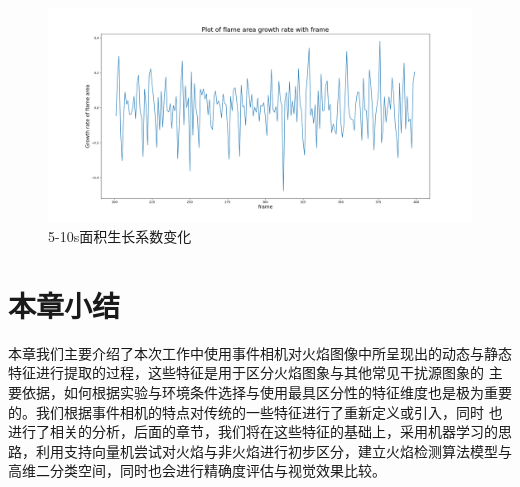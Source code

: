 \begin{figure}[ht]
        \centering
        \includegraphics[width=\textwidth]{figures/extract_area_02.png}
        \caption{5-10s面积生长系数变化}
        \label{13}
\end{figure}

\section{本章小结}
本章我们主要介绍了本次工作中使用事件相机对火焰图像中所呈现出的动态与静态特征进行提取的过程，这些特征是用于区分火焰图象与其他常见干扰源图象的
主要依据，如何根据实验与环境条件选择与使用最具区分性的特征维度也是极为重要的。我们根据事件相机的特点对传统的一些特征进行了重新定义或引入，同时
也进行了相关的分析，后面的章节，我们将在这些特征的基础上，采用机器学习的思路，利用支持向量机尝试对火焰与非火焰进行初步区分，建立火焰检测算法模型与高维二分类空间，同时也会进行精确度评估与视觉效果比较。